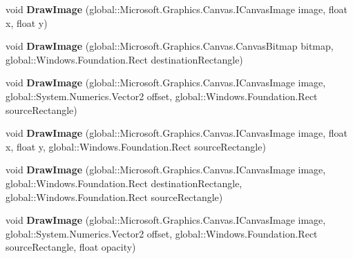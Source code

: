 \begin{DoxyCompactItemize}
void {\bfseries Draw\+Image} (global\+::\+Microsoft.\+Graphics.\+Canvas.\+I\+Canvas\+Image image, float x, float y)
\item 
\mbox{\label{class_microsoft_1_1_graphics_1_1_canvas_1_1_canvas_drawing_session_a541568321b8b658d00742ae7ad99cac9}} 
void {\bfseries Draw\+Image} (global\+::\+Microsoft.\+Graphics.\+Canvas.\+Canvas\+Bitmap bitmap, global\+::\+Windows.\+Foundation.\+Rect destination\+Rectangle)
\item 
\mbox{\label{class_microsoft_1_1_graphics_1_1_canvas_1_1_canvas_drawing_session_a6310e61010770fe5778d67e339d796f0}} 
void {\bfseries Draw\+Image} (global\+::\+Microsoft.\+Graphics.\+Canvas.\+I\+Canvas\+Image image, global\+::\+System.\+Numerics.\+Vector2 offset, global\+::\+Windows.\+Foundation.\+Rect source\+Rectangle)
\item 
\mbox{\label{class_microsoft_1_1_graphics_1_1_canvas_1_1_canvas_drawing_session_a772f53102b4ecaf7f4709b7cf9d0be27}} 
void {\bfseries Draw\+Image} (global\+::\+Microsoft.\+Graphics.\+Canvas.\+I\+Canvas\+Image image, float x, float y, global\+::\+Windows.\+Foundation.\+Rect source\+Rectangle)
\item 
\mbox{\label{class_microsoft_1_1_graphics_1_1_canvas_1_1_canvas_drawing_session_a7f77f768e0f4057f678c97ee540a578b}} 
void {\bfseries Draw\+Image} (global\+::\+Microsoft.\+Graphics.\+Canvas.\+I\+Canvas\+Image image, global\+::\+Windows.\+Foundation.\+Rect destination\+Rectangle, global\+::\+Windows.\+Foundation.\+Rect source\+Rectangle)
\item 
\mbox{\label{class_microsoft_1_1_graphics_1_1_canvas_1_1_canvas_drawing_session_a7588275f578557a9405d27c1f53ef863}} 
void {\bfseries Draw\+Image} (global\+::\+Microsoft.\+Graphics.\+Canvas.\+I\+Canvas\+Image image, global\+::\+System.\+Numerics.\+Vector2 offset, global\+::\+Windows.\+Foundation.\+Rect source\+Rectangle, float opacity)
\item 
\mbox{\label{class_microsoft_1_1_graphics_1_1_canvas_1_1_canvas_drawing_session_a706a75446a9c15fe55e9217716f95241}} 

\end{DoxyCompactItemize}
